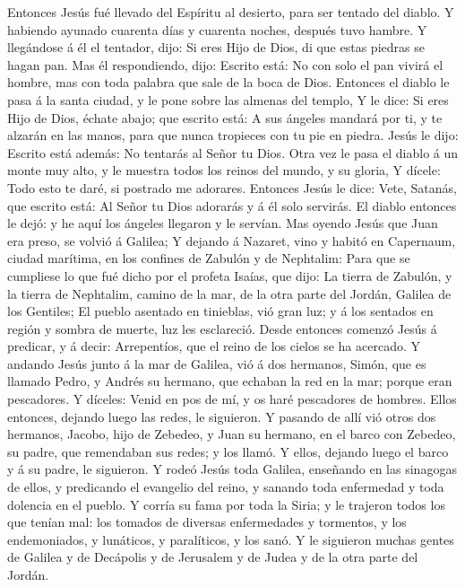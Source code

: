  Entonces Jesús fué llevado del Espíritu al desierto, para
ser tentado del diablo.  Y habiendo ayunado cuarenta días y
cuarenta noches, después tuvo hambre.  Y llegándose á él el
tentador, dijo: Si eres Hijo de Dios, di que estas piedras se hagan pan.
 Mas él respondiendo, dijo: Escrito está: No con solo el pan
vivirá el hombre, mas con toda palabra que sale de la boca de Dios.
 Entonces el diablo le pasa á la santa ciudad, y le pone
sobre las almenas del templo,  Y le dice: Si eres Hijo de
Dios, échate abajo; que escrito está: A sus ángeles mandará por ti, y te
alzarán en las manos, para que nunca tropieces con tu pie en piedra.
 Jesús le dijo: Escrito está además: No tentarás al Señor tu
Dios.  Otra vez le pasa el diablo á un monte muy alto, y le
muestra todos los reinos del mundo, y su gloria,  Y dícele:
Todo esto te daré, si postrado me adorares.  Entonces Jesús
le dice: Vete, Satanás, que escrito está: Al Señor tu Dios adorarás y á
él solo servirás.  El diablo entonces le dejó: y he aquí
los ángeles llegaron y le servían.  Mas oyendo Jesús que
Juan era preso, se volvió á Galilea;  Y dejando á Nazaret,
vino y habitó en Capernaum, ciudad marítima, en los confines de Zabulón
y de Nephtalim:  Para que se cumpliese lo que fué dicho por
el profeta Isaías, que dijo:  La tierra de Zabulón, y la
tierra de Nephtalim, camino de la mar, de la otra parte del Jordán,
Galilea de los Gentiles;  El pueblo asentado en tinieblas,
vió gran luz; y á los sentados en región y sombra de muerte, luz les
esclareció.  Desde entonces comenzó Jesús á predicar, y á
decir: Arrepentíos, que el reino de los cielos se ha acercado.
 Y andando Jesús junto á la mar de Galilea, vió á dos
hermanos, Simón, que es llamado Pedro, y Andrés su hermano, que echaban
la red en la mar; porque eran pescadores.  Y díceles: Venid
en pos de mí, y os haré pescadores de hombres.  Ellos
entonces, dejando luego las redes, le siguieron.  Y pasando
de allí vió otros dos hermanos, Jacobo, hijo de Zebedeo, y Juan su
hermano, en el barco con Zebedeo, su padre, que remendaban sus redes; y
los llamó.  Y ellos, dejando luego el barco y á su padre,
le siguieron.  Y rodeó Jesús toda Galilea, enseñando en las
sinagogas de ellos, y predicando el evangelio del reino, y sanando toda
enfermedad y toda dolencia en el pueblo.  Y corría su fama
por toda la Siria; y le trajeron todos los que tenían mal: los tomados
de diversas enfermedades y tormentos, y los endemoniados, y lunáticos, y
paralíticos, y los sanó.  Y le siguieron muchas gentes de
Galilea y de Decápolis y de Jerusalem y de Judea y de la otra parte del
Jordán.

